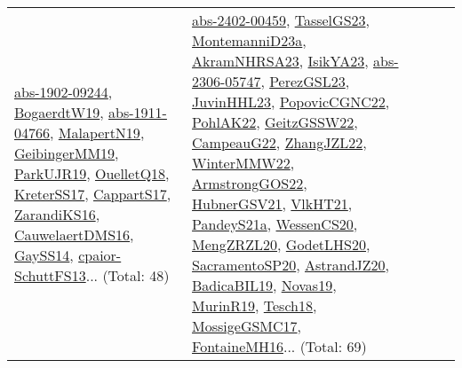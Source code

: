 {\begin{longtable}{lp{3cm}>{\raggedright}p{6cm}>{\raggedright}p{6cm}p{8cm}}
\href{articles/abs-1902-09244.pdf}{abs-1902-09244}\cite{abs-1902-09244}, \href{papers/BogaerdtW19.pdf}{BogaerdtW19}\cite{BogaerdtW19}, \href{articles/abs-1911-04766.pdf}{abs-1911-04766}\cite{abs-1911-04766}, \href{papers/MalapertN19.pdf}{MalapertN19}\cite{MalapertN19}, \href{papers/GeibingerMM19.pdf}{GeibingerMM19}\cite{GeibingerMM19}, \href{papers/ParkUJR19.pdf}{ParkUJR19}\cite{ParkUJR19}, \href{papers/OuelletQ18.pdf}{OuelletQ18}\cite{OuelletQ18}, \href{articles/KreterSS17.pdf}{KreterSS17}\cite{KreterSS17}, \href{papers/CappartS17.pdf}{CappartS17}\cite{CappartS17}, \href{articles/ZarandiKS16.pdf}{ZarandiKS16}\cite{ZarandiKS16}, \href{papers/CauwelaertDMS16.pdf}{CauwelaertDMS16}\cite{CauwelaertDMS16}, \href{papers/GaySS14.pdf}{GaySS14}\cite{GaySS14}, \href{papers/cpaior-SchuttFS13.pdf}{cpaior-SchuttFS13}\cite{cpaior-SchuttFS13}... (Total: 48) & \href{articles/abs-2402-00459.pdf}{abs-2402-00459}\cite{abs-2402-00459}, \href{papers/TasselGS23.pdf}{TasselGS23}\cite{TasselGS23}, \href{articles/MontemanniD23a.pdf}{MontemanniD23a}\cite{MontemanniD23a}, \href{articles/AkramNHRSA23.pdf}{AkramNHRSA23}\cite{AkramNHRSA23}, \href{articles/IsikYA23.pdf}{IsikYA23}\cite{IsikYA23}, \href{articles/abs-2306-05747.pdf}{abs-2306-05747}\cite{abs-2306-05747}, \href{papers/PerezGSL23.pdf}{PerezGSL23}\cite{PerezGSL23}, \href{papers/JuvinHHL23.pdf}{JuvinHHL23}\cite{JuvinHHL23}, \href{papers/PopovicCGNC22.pdf}{PopovicCGNC22}\cite{PopovicCGNC22}, \href{articles/PohlAK22.pdf}{PohlAK22}\cite{PohlAK22}, \href{papers/GeitzGSSW22.pdf}{GeitzGSSW22}\cite{GeitzGSSW22}, \href{articles/CampeauG22.pdf}{CampeauG22}\cite{CampeauG22}, \href{papers/ZhangJZL22.pdf}{ZhangJZL22}\cite{ZhangJZL22}, \href{papers/WinterMMW22.pdf}{WinterMMW22}\cite{WinterMMW22}, \href{papers/ArmstrongGOS22.pdf}{ArmstrongGOS22}\cite{ArmstrongGOS22}, \href{articles/HubnerGSV21.pdf}{HubnerGSV21}\cite{HubnerGSV21}, \href{articles/VlkHT21.pdf}{VlkHT21}\cite{VlkHT21}, \href{articles/PandeyS21a.pdf}{PandeyS21a}\cite{PandeyS21a}, \href{papers/WessenCS20.pdf}{WessenCS20}\cite{WessenCS20}, \href{articles/MengZRZL20.pdf}{MengZRZL20}\cite{MengZRZL20}, \href{papers/GodetLHS20.pdf}{GodetLHS20}\cite{GodetLHS20}, \href{articles/SacramentoSP20.pdf}{SacramentoSP20}\cite{SacramentoSP20}, \href{articles/AstrandJZ20.pdf}{AstrandJZ20}\cite{AstrandJZ20}, \href{papers/BadicaBIL19.pdf}{BadicaBIL19}\cite{BadicaBIL19}, \href{articles/Novas19.pdf}{Novas19}\cite{Novas19}, \href{papers/MurinR19.pdf}{MurinR19}\cite{MurinR19}, \href{papers/Tesch18.pdf}{Tesch18}\cite{Tesch18}, \href{papers/MossigeGSMC17.pdf}{MossigeGSMC17}\cite{MossigeGSMC17}, \href{papers/FontaineMH16.pdf}{FontaineMH16}\cite{FontaineMH16}... (Total: 69)\\

\end{longtable}}
